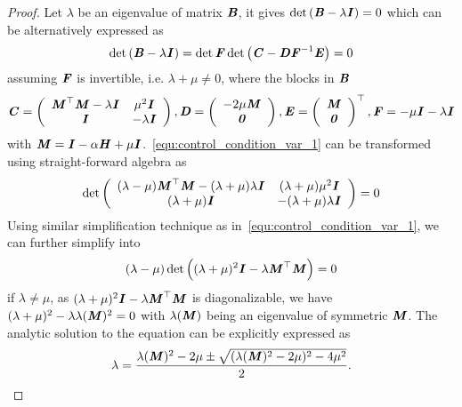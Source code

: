 \begin{lemma}
\begin{proof}
	Let $\lambda$ be an eigenvalue of matrix $\bm{\mathit{B}}$, it gives 
$\det\left(\bm{\mathit{B}} - \lambda \bm{\mathit{I}} \right) = 0$ which can be alternatively expressed as
\begin{equation}	
\det \left( \bm{\mathit{B}} - \lambda \bm{\mathit{I}}\right) = \det{\bm{\mathit{F}}} \det{\left(\bm{\mathit{C}} - \bm{\mathit{D}} \bm{\mathit{F}}^{-1}
\bm{\mathit{E}} \right)} = 0
\label{equ:control_condition_var_1}
\end{equation}
assuming $\bm{\mathit{F}}$ is invertible, i.e. $\lambda + \mu \neq 0$, where the blocks in $\bm{\mathit{B}}$ 
\begin{equation*}
		\bm{\mathit{C}} = \left( { \begin{array}{c c}
 			\bm{\mathit{M}}^{\top}\bm{\mathit{M}} - \lambda \bm{\mathit{I}} &  \mu^2 \bm{\mathit{I}} \\
 			\bm{\mathit{I}} & - \lambda \bm{\mathit{I}}
 		\end{array} } \right), 
 		\bm{\mathit{D}} = \left( { \begin{array}{c}
 			-2\mu \bm{\mathit{M}} \\
 			\bm{\mathit{0}}
 		\end{array}}\right),
 		\bm{\mathit{E}} = \left( {\begin{array}{c}
 			\bm{\mathit{M}} \\
 			\bm{\mathit{0}}
 		\end{array}} \right)^{\top},
 		\bm{\mathit{F}} = -\mu \bm{\mathit{I}} - \lambda \bm{\mathit{I}}
	\end{equation*}
	with $\bm{\mathit{M}}=\bm{\mathit{I}}-\alpha \bm{\mathit{H}} + \mu \bm{\mathit{I}}$.~\eqref{equ:control_condition_var_1} can be transformed using straight-forward algebra as
	\begin{equation}
		\det \left( \begin{array}{c c}
 			(\lambda - \mu) \bm{\mathit{M}}^{\top}\bm{\mathit{M}} - (\lambda + \mu) \lambda \bm{\mathit{I}} & (\lambda + \mu)\mu^2 \bm{\mathit{I}} \\
 			(\lambda + \mu) \bm{\mathit{I}} & -(\lambda + \mu)\lambda \bm{\mathit{I}}
 		\end{array} \right) = 0
		\label{equ:control_condition_var_2}	
	\end{equation}
	Using similar simplification technique as in~\eqref{equ:control_condition_var_1}, we can further simplify into
	\begin{equation}
		(\lambda - \mu)\det \left( (\lambda + \mu)^2 \bm{\mathit{I}} - \lambda \bm{\mathit{M}}^{\top}\bm{\mathit{M}} \right) = 0
	\end{equation}
	if $\lambda \neq \mu$, as $(\lambda + \mu)^2 \bm{\mathit{I}} - \lambda \bm{\mathit{M}}^{\top}\bm{\mathit{M}}$ is diagonalizable, we have $(\lambda + \mu)^2 - \lambda \lambda(\bm{\mathit{M}})^2 = 0$ with $\lambda(\bm{\mathit{M}})$ being an eigenvalue of symmetric $\bm{\mathit{M}}$. The analytic solution to the equation can be explicitly expressed as
	\begin{equation}
		\lambda = \frac{\lambda(\bm{\mathit{M}})^2 - 2\mu \pm \sqrt{(\lambda(\bm{\mathit{M}})^2 - 2\mu)^2 - 4\mu^2}}{2}.
		\label{equ:control_condition_var_3}	
	\end{equation}
	

\end{proof}
\end{lemma}
